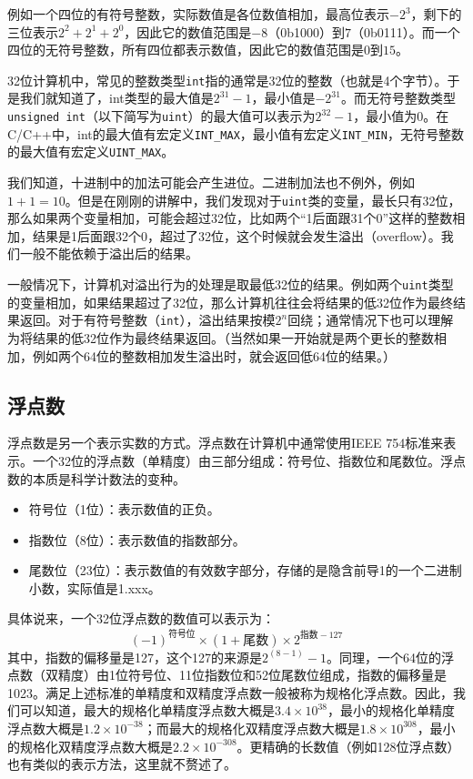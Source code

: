 \documentclass[../main.tex]{subfiles}
\begin{document}
例如一个四位的有符号整数，实际数值是各位数值相加，最高位表示$-2^3$，剩下的三位表示$2^2 + 2^1 + 2^0$，因此它的数值范围是$-8$（0b1000）到$7$（0b0111）。而一个四位的无符号整数，所有四位都表示数值，因此它的数值范围是$0$到$15$。

32位计算机中，常见的整数类型\texttt{int}指的通常是32位的整数（也就是4个字节）。于是我们就知道了，int类型的最大值是$2^{31}-1$，最小值是$-2^{31}$。而无符号整数类型\texttt{unsigned int}（以下简写为\texttt{uint}）的最大值可以表示为$2^{32}-1$，最小值为0。在C/C++中，int的最大值有宏定义\texttt{INT\_MAX}，最小值有宏定义\texttt{INT\_MIN}，无符号整数的最大值有宏定义\texttt{UINT\_MAX}。

我们知道，十进制中的加法可能会产生进位。二进制加法也不例外，例如$1+1=10$。但是在刚刚的讲解中，我们发现对于\texttt{uint}类的变量，最长只有32位，那么如果两个变量相加，可能会超过32位，比如两个“1后面跟31个0”这样的整数相加，结果是1后面跟32个0，超过了32位，这个时候就会发生溢出（overflow）。我们一般不能依赖于溢出后的结果。

一般情况下，计算机对溢出行为的处理是取最低32位的结果。例如两个\texttt{uint}类型的变量相加，如果结果超过了32位，那么计算机往往会将结果的低32位作为最终结果返回。对于有符号整数（\texttt{int}），溢出结果按模$2^n$回绕；通常情况下也可以理解为将结果的低32位作为最终结果返回。（当然如果一开始就是两个更长的整数相加，例如两个64位的整数相加发生溢出时，就会返回低64位的结果。）

\subsection{浮点数}

浮点数是另一个表示实数的方式。浮点数在计算机中通常使用IEEE 754标准来表示。一个32位的浮点数（单精度）由三部分组成：符号位、指数位和尾数位。浮点数的本质是科学计数法的变种。
\begin{itemize}
  \item 符号位（1位）：表示数值的正负。
  \item 指数位（8位）：表示数值的指数部分。
  \item 尾数位（23位）：表示数值的有效数字部分，存储的是隐含前导1的一个二进制小数，实际值是1.xxx。
\end{itemize}

具体说来，一个32位浮点数的数值可以表示为：
$$(-1)^{\text{符号位}} \times (1 + \text{尾数}) \times 2^{\text{指数} - 127}$$
其中，指数的偏移量是127，这个127的来源是$2^{(8-1)} - 1$。同理，一个64位的浮点数（双精度）由1位符号位、11位指数位和52位尾数位组成，指数的偏移量是1023。满足上述标准的单精度和双精度浮点数一般被称为规格化浮点数。因此，我们可以知道，最大的规格化单精度浮点数大概是$3.4 \times 10^{38}$，最小的规格化单精度浮点数大概是$1.2 \times 10^{-38}$；而最大的规格化双精度浮点数大概是$1.8 \times 10^{308}$，最小的规格化双精度浮点数大概是$2.2 \times 10^{-308}$。更精确的长数值（例如128位浮点数）也有类似的表示方法，这里就不赘述了。
\end{document}
